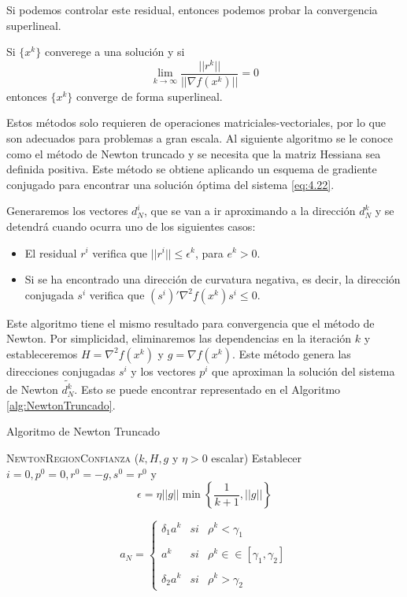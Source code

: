 Si podemos controlar este residual, entonces podemos probar la convergencia superlineal.

\begin{proposicion}
Si $\{x^k\}$ converege a una solución y si 
\begin{equation*}
\lim_{k\xrightarrow{}{}\infty} \dfrac{||r^k||}{||\nabla f(x^k)||} = 0
\end{equation*}
entonces $\{x^k\}$ converge de forma superlineal.
\end{proposicion}

Estos métodos solo requieren de operaciones matriciales-vectoriales, por lo que son adecuados para problemas a gran escala. 
Al siguiente algoritmo se le conoce como el método de Newton truncado y se necesita que la matriz Hessiana sea definida positiva. 
Este método se obtiene aplicando un esquema de gradiente conjugado para encontrar una solución óptima del sistema \ref{eq:4.22}.

Generaremos los vectores $d_N^i$, que se van a ir aproximando a la dirección $d_N^k$ y se detendrá cuando ocurra uno de los siguientes casos:
\begin{itemize}
	\item El residual $r^i$ verifica que $||r^i|| \leq \epsilon^k$, para $e^k > 0$.
	\item Si se ha encontrado una dirección de curvatura negativa, es decir, la dirección conjugada $s^i$ verifica que $(s^i)'\nabla^2f(x^k)s^i\leq 0$.
\end{itemize}

Este algoritmo tiene el mismo resultado para convergencia que el método de Newton. 
Por simplicidad, eliminaremos las dependencias en la iteración $k$ y estableceremos $H = \nabla^2 f(x^k)$ y $g=\nabla f(x^k)$. 
Este método genera las direcciones conjugadas $s^i$ y los vectores $p^i$ que aproximan la solución del sistema de Newton $\widetilde{d^k_N}$. 
Esto se puede encontrar representado en el Algoritmo \ref{alg:NewtonTruncado}.

\begin{algorithm}
\caption{Algoritmo de Newton Truncado}\label{alg:NewtonTruncado}
\begin{algorithmic}[1]
\Procedure \textsc{NewtonRegionConfianza} ($k,H,g$ y $\eta>0$ escalar)
\State Establecer $i=0, p^0=0,r^0=-g,s^0=r^0$ y \begin{equation*}
	\epsilon = \eta ||g||\min\left\lbrace \dfrac{1}{k+1}, ||g|| \right\rbrace
\end{equation*}
\While{}

\EndWhile
\State \begin{equation*}
	a_N = \left\{ \begin{array}{lcc}
             \delta_1a^k &   si  & \rho^k < \gamma_1 \\
             \\ a^k &  si & \rho^k\in\in [\gamma_1,\gamma_2] \\
             \\ \delta_2a^k & si & \rho^k > \gamma_2
             \end{array}
   \right.
	\end{equation*}
\EndProcedure
\end{algorithmic}
\end{algorithm}

